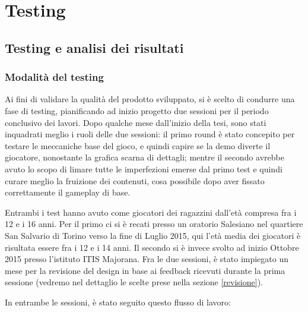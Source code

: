 \chapter{Testing}
\label{chap:testing}

\section{Testing e analisi dei risultati}

\subsection{Modalità del testing}

Ai fini di validare la qualità del prodotto sviluppato, si è scelto di condurre una fase di testing, pianificando ad inizio progetto due sessioni per il periodo conclusivo dei lavori. Dopo qualche mese dall'inizio della tesi, sono stati inquadrati meglio i ruoli delle due sessioni: il primo round è stato concepito per testare le meccaniche base del gioco, e quindi capire se la demo diverte il giocatore, nonostante la grafica scarna di dettagli; mentre il secondo avrebbe avuto lo scopo di limare tutte le imperfezioni emerse dal primo test e quindi curare meglio la fruizione dei contenuti, cosa possibile dopo aver fissato correttamente il gameplay di base.

Entrambi i test hanno avuto come giocatori dei ragazzini dall'età compresa fra i 12 e i 16 anni. Per il primo ci si è recati presso un oratorio Salesiano nel quartiere San Salvario di Torino verso la fine di Luglio 2015, qui l'età media dei giocatori è risultata essere fra i 12 e i 14 anni. Il secondo si è invece svolto ad inizio Ottobre 2015 presso l'istituto ITIS Majorana. Fra le due sessioni, è stato impiegato un mese per la revisione del design in base ai feedback ricevuti durante la prima sessione (vedremo nel dettaglio le scelte prese nella sezione \ref{revisione}).

In entrambe le sessioni, è stato seguito questo flusso di lavoro:

